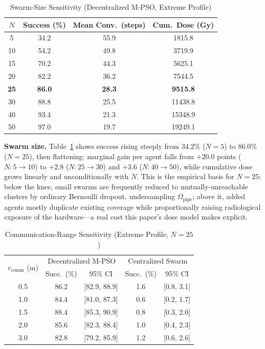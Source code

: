 \documentclass[conference]{IEEEtran}
\begin{document}
\begin{table}[t]
\renewcommand{\arraystretch}{0.85}
\caption{Swarm-Size Sensitivity (Decentralized M-PSO, Extreme Profile)}
\label{tab:sweep-n}
\centering
\scriptsize
\setlength{\tabcolsep}{4pt}
\begin{tabular}{@{}c c c c@{}}
\toprule
$N$ & Success (\%) & Mean Conv.\ (steps) & Cum.\ Dose (Gy) \\
\midrule
5  & 34.2 & 55.9 & 1815.8 \\
10 & 54.2 & 49.8 & 3719.9 \\
15 & 70.2 & 44.3 & 5625.1 \\
20 & 82.2 & 36.2 & 7544.5 \\
\textbf{25} & \textbf{86.0} & \textbf{28.3} & \textbf{9515.8} \\
30 & 88.8 & 25.5 & 11438.8 \\
40 & 93.4 & 21.3 & 15348.9 \\
50 & 97.0 & 19.7 & 19249.1 \\
\bottomrule
\end{tabular}
\end{table}

\textbf{Swarm size.} Table~\ref{tab:sweep-n} shows success rising steeply from $34.2\%$ ($N=5$) to $86.0\%$ ($N=25$), then flattening: marginal gain per agent falls from $+20.0$ points ($N{:}5{\to}10$) to $+2.8$ ($N{:}25{\to}30$) and $+3.6$ ($N{:}40{\to}50$), while cumulative dose grows linearly and unconditionally with $N$. This is the empirical basis for $N=25$: below the knee, small swarms are frequently reduced to mutually-unreachable clusters by ordinary Bernoulli dropout, undersampling $\Omega_{\text{pipe}}$; above it, added agents mostly duplicate existing coverage while proportionally raising radiological exposure of the hardware---a real cost this paper's dose model makes explicit.

\begin{table}[t]
\renewcommand{\arraystretch}{0.85}
\caption{Communication-Range Sensitivity (Extreme Profile, $N=25$)}
\label{tab:sweep-rcomm}
\centering
\scriptsize
\setlength{\tabcolsep}{3pt}
\begin{tabular}{@{}c c c c c@{}}
\toprule
\multirow{2}{*}{$r_{\text{comm}}$ (m)} & \multicolumn{2}{c}{Decentralized M-PSO} & \multicolumn{2}{c}{Centralized Swarm} \\
 & Succ.\ (\%) & 95\% CI & Succ.\ (\%) & 95\% CI \\
\midrule
0.5 & 86.2 & [82.9, 88.9] & 1.6 & [0.8, 3.1] \\
1.0 & 84.4 & [81.0, 87.3] & 0.6 & [0.2, 1.7] \\
1.5 & 88.4 & [85.3, 90.9] & 0.8 & [0.3, 2.0] \\
2.0 & 85.6 & [82.3, 88.4] & 1.0 & [0.4, 2.3] \\
3.0 & 82.8 & [79.2, 85.9] & 1.2 & [0.6, 2.6] \\
\bottomrule
\end{tabular}
\end{table}
\end{document}
